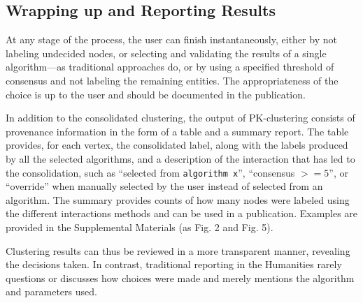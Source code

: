 



\begin{revs}
\subsection {Wrapping up and Reporting Results}

At any stage of the process, the user can finish instantaneously, either by not labeling undecided nodes, or selecting and validating the results of a single algorithm---as traditional approaches do, or by using a specified threshold of consensus and not labeling the remaining entities. The appropriateness of the choice is up to the user and should be documented in the publication.

In addition to the consolidated clustering, the output of PK-clustering consists of provenance information in the form of a table and a summary report.
The table provides, for each vertex, the consolidated label, along with the labels produced by all the selected algorithms, and a description of the interaction that has led to the consolidation, such as ``selected from \verb|algorithm x|'', ``consensus $>= 5$'', or ``override'' when manually selected by the user instead of selected from an algorithm.  The summary provides counts of how many nodes were labeled using the different interactions methods and can be used in a publication. Examples are provided in the Supplemental Materials (as Fig. 2 and Fig. 5). %

Clustering results can thus be reviewed in a more transparent manner, revealing the decisions taken. In contrast, traditional reporting in the Humanities rarely questions or discusses how choices were made and merely mentions the  algorithm and parameters used.

\end{revs}


